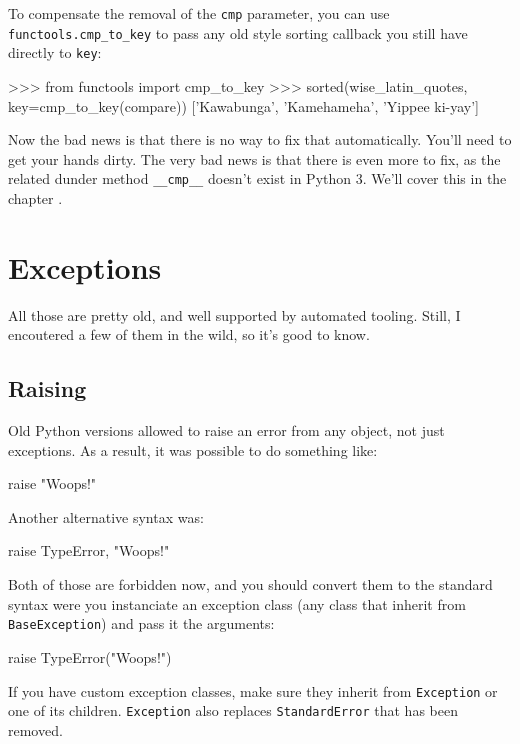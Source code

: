 To compensate the removal of the \lstinline{cmp} parameter, you can use \lstinline{functools.cmp_to_key} to pass any old style sorting callback you still have directly to \lstinline{key}:

\begin{py2and3}
>>> from functools import cmp_to_key
>>> sorted(wise_latin_quotes, key=cmp_to_key(compare))
['Kawabunga', 'Kamehameha', 'Yippee ki-yay']
\end{py2and3}

Now the bad news is that there is no way to fix that automatically. You'll need to get your hands dirty. The very bad news is that there is even more to fix, as the related \gls{dunder} method \lstinline{__cmp__} doesn't exist in Python 3. We'll cover this in the chapter .

\section{Exceptions}

All those are pretty old, and well supported by automated tooling. Still, I encoutered a few of them in the wild, so it's good to know.

\subsection{Raising}

Old Python versions allowed to raise an error from any object, not just exceptions. As a result, it was possible to do something like:

\begin{py2}
raise "Woops!"
\end{py2}

Another alternative syntax was:

\begin{py2}
raise TypeError, "Woops!"
\end{py2}

Both of those are forbidden now, and you should convert them to the standard syntax were you instanciate an exception class (any class that inherit from \lstinline{BaseException}) and pass it the arguments:

\begin{py2and3}
raise TypeError("Woops!")
\end{py2and3}

If you have custom exception classes, make sure they inherit from \lstinline{Exception} or one of its children. \lstinline{Exception} also replaces \lstinline{StandardError} that has been removed.

